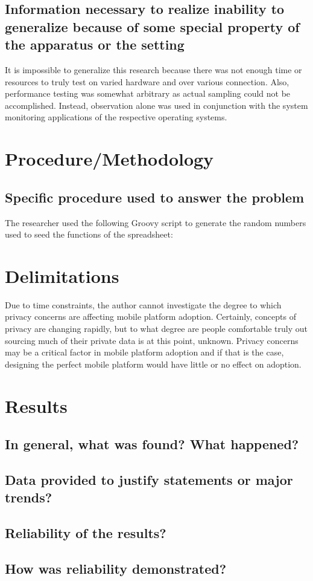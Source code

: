 \documentclass[12pt,oneside,letterpaper,titlepage]{article}
\begin{document}
\subsection{Information necessary to realize inability to generalize because of some special property of the apparatus or the setting}

It is impossible to generalize this research because there was not enough time
or resources to truly test on varied hardware and over various connection.
Also, performance testing was somewhat arbitrary as actual sampling could not be
accomplished.  Instead, observation alone was used in conjunction with the
system monitoring applications of the respective operating systems.

\section{Procedure/Methodology}


\subsection{Specific procedure used to answer the problem}

The researcher used the following Groovy script to generate the random numbers
used to seed the functions of the spreadsheet:


\section{Delimitations}


Due to time constraints, the author cannot investigate the degree to which
privacy concerns are affecting mobile platform adoption.  Certainly, concepts of
privacy are changing rapidly, but to what degree are people comfortable truly
out sourcing much of their private data is at this point, unknown.  Privacy
concerns may be a critical factor in mobile platform adoption and if that is the
case, designing the perfect mobile platform would have little or no effect on
adoption.

\section{Results}

\subsection{In general, what was found? What happened?}

\subsection{Data provided to justify statements or major trends?}

\subsection{Reliability of the results?}

\subsection{How was reliability demonstrated?}
\end{document}
